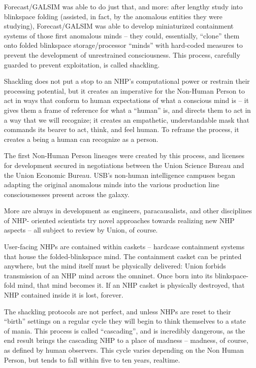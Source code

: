 Forecast/GALSIM was able to do just that, and more: after lengthy study into blinkspace folding  
(assisted, in fact, by the anomalous entities they were studying), Forecast/GALSIM was able to  
develop miniaturized containment systems of those first anomalous minds -- they could,  
essentially, “clone” them onto folded blinkspace storage/processor “minds” with hard-coded  
measures to prevent the development of unrestrained consciousness. This process, carefully  
guarded to prevent exploitation, is called shackling. 
 

Shackling does not put a stop to an NHP’s computational power or restrain their processing  
potential, but it creates an imperative for the Non-Human Person to act in ways that conform to  
human expectations of what a conscious mind is -- it gives them a frame of reference for what a  
“human” is, and directs them to act in a way that we will recognize; it creates an empathetic,  
understandable mask that commands its bearer to act, think, and feel human. To reframe the  
process, it creates a being a human can recognize as a person.  
 

The first Non-Human Person lineages were created by this process, and licenses for  
development secured in negotiations between the Union Science Bureau and the Union  
Economic Bureau. USB’s non-human intelligence campuses began adapting the original  
anomalous minds into the various production line consciousnesses present across the galaxy. 
 

More are always in development as engineers, paracausalists, and other disciplines of NHP- 
oriented scientists try novel approaches towards realizing new NHP aspects -- all subject to  
review by Union, of course.   
 

User-facing NHPs are contained within caskets -- hardcase containment systems that house the  
folded-blinkspace mind. The containment casket can be printed anywhere, but the mind itself  
must be physically delivered: Union forbids transmission of an NHP mind across the omninet.  
Once born into its blinkspace-fold mind, that mind becomes it. If an NHP casket is physically  
destroyed, that NHP contained inside it is lost, forever.  
 

                                                                                                          


The shackling protocols are not perfect, and unless NHPs are reset to their “birth” settings on a  
regular cycle they will begin to think themselves to a state of mania. This process is called  
“cascading”, and is incredibly dangerous, as the end result brings the cascading NHP to a place  
of madness -- madness, of course, as defined by human observers. This cycle varies depending  
on the Non Human Person, but tends to fall within five to ten years, realtime. 
 

